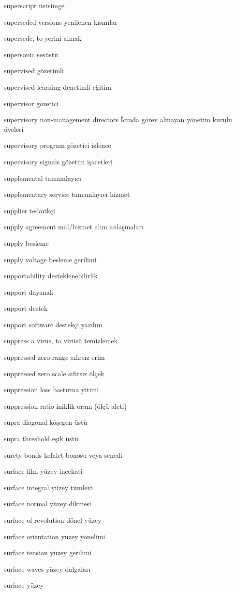 \documentclass[12pt,fleqn]{article}\usepackage{../../common}
\begin{document}
superscript üstsimge

superseded versions yenilenen kısımlar

supersede, to yerini almak

supersonic sesüstü

supervised gözetimli

supervised learning denetimli eğitim

supervisor gözetici

supervisory non-management directors İcrada görev almayan yönetim kurulu üyeleri

supervisory program gözetici izlence

supervisory signals gözetim işaretleri

supplemental tamamlayıcı

supplementary service tamamlayıcı hizmet

supplier tedarikçi

supply agreement mal/hizmet alım anlaşmaları

supply besleme

supply voltage besleme gerilimi

supportability desteklenebilirlik

support dayanak

support destek

support software destekçi yazılım

suppress a virus, to virüsü temizlemek

suppressed zero range sıfırsız erim

suppressed zero scale sıfırsız ölçek

suppression loss bastırma yitimi

suppression ratio iniklik oranı (ölçü aleti)

supra diagonal köşegen üstü

supra threshold eşik üstü

surety bonds kefalet bonosu veya senedi

surface film yüzey incekati

surface integral yüzey tümlevi

surface normal yüzey dikmesi

surface of revolution dönel yüzey

surface orientation yüzey yönelimi

surface tension yüzey gerilimi

surface waves yüzey dalgaları

surface yüzey
\end{document}
